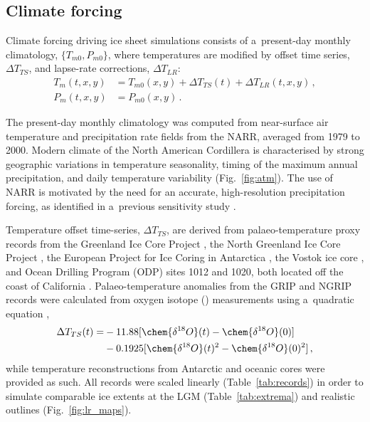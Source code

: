 \documentclass[tc, manuscript]{copernicus}
\begin{document}
\subsection{Climate forcing}
\label{sec:atm}

      Climate forcing driving ice sheet simulations consists of
      a~present-day monthly climatology,
$\{T_{m0}, P_{m0}\}$, where temperatures are modified by offset time series,
${\Delta}T_{TS}$, and lapse-rate corrections, ${\Delta}T_{LR}$:
\begin{align}
    T_m(t, x, y) &= T_{m0}(x, y) + {\Delta}T_{TS}(t)
                    + {\Delta}T_{LR}(t, x, y) \,, \\
    P_m(t, x, y) &= P_{m0}(x, y) \,.
\end{align}

      The present-day monthly climatology was computed from near-surface air
      temperature and precipitation rate fields from the NARR, averaged from
      1979 to 2000. Modern climate of the North American Cordillera is
      characterised by strong geographic variations in temperature
      seasonality, timing of the maximum annual precipitation, and daily
      temperature variability (Fig.~\ref{fig:atm}). The use of NARR is
      motivated by the need for an accurate, high-resolution precipitation
      forcing, as identified in a~previous sensitivity study
      \citep{Seguinot.etal.2014}.

      Temperature offset time-series, ${\Delta}T_{TS}$, are derived from
      palaeo-temperature proxy records from the Greenland Ice Core Project
      \citep[GRIP,][]{Dansgaard.etal.1993}, the North Greenland Ice Core
      Project \citep[NGRIP,][]{Andersen.etal.2004}, the European Project for
      Ice Coring in Antarctica \citep[EPICA,][] {Jouzel.etal.2007}, the
      Vostok ice core \citep{Petit.etal.1999}, and Ocean Drilling Program
      (ODP) sites 1012 and 1020, both located off the coast of California
      \citep{Herbert.etal.2001}. Palaeo-temperature anomalies from the GRIP
      and NGRIP records were calculated from oxygen isotope
      () measurements using a~quadratic equation
      \citep{Johnsen.etal.1995},
\begin{align}
    {\Delta}T_{TS}(t) = &-11.88 [\chem{\delta^{18}O}(t)
                                -\chem{\delta^{18}O}(0)] \nonumber \\
                        &-0.1925[\chem{\delta^{18}O}(t)^2
                                 -\chem{\delta^{18}O}(0)^2] \,,
\end{align}
      while temperature reconstructions from Antarctic and oceanic cores
      were provided as such. All records were scaled linearly
      (Table~\ref{tab:records}) in order to simulate comparable ice extents
      at the LGM (Table~\ref{tab:extrema}) and realistic outlines
      (Fig.~\ref{fig:lr_maps}).
\end{document}
